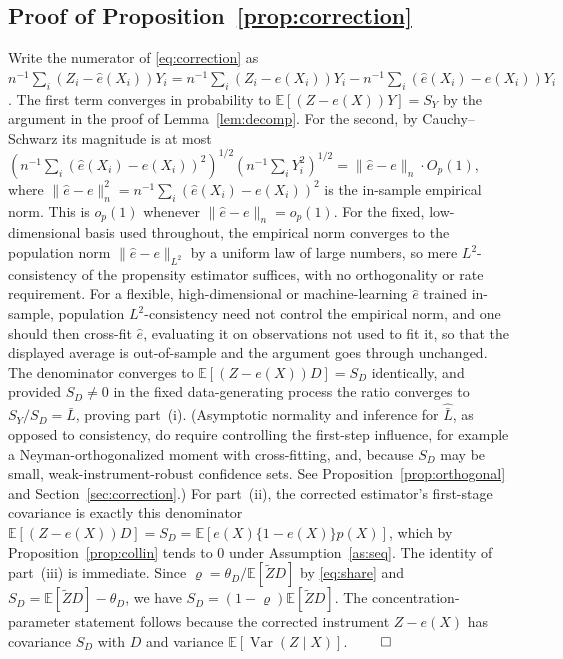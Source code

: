 \documentclass[preprint,11pt,authoryear]{elsarticle}
\theoremstyle{definition}
\newcommand{\E}{\mathbb{E}}
\newcommand{\Var}{\operatorname{Var}}
\newcommand{\Ztil}{\tilde{Z}}
\begin{document}
\subsection*{Proof of Proposition~\ref{prop:correction}}
Write the numerator of \eqref{eq:correction} as
$n^{-1}\sum_i(Z_i-\hat e(X_i))Y_i=n^{-1}\sum_i(Z_i-e(X_i))Y_i
-n^{-1}\sum_i(\hat e(X_i)-e(X_i))Y_i$. The first term converges in probability to
$\E[(Z-e(X))Y]=S_Y$ by the argument in the proof of Lemma~\ref{lem:decomp}. For
the second, by Cauchy--Schwarz its magnitude is at most
$(n^{-1}\sum_i(\hat e(X_i)-e(X_i))^2)^{1/2}(n^{-1}\sum_i Y_i^2)^{1/2}
=\|\hat e-e\|_{n}\cdot O_p(1)$, where $\|\hat e-e\|_{n}^2=n^{-1}\sum_i(\hat
e(X_i)-e(X_i))^2$ is the in-sample empirical norm. This is $o_p(1)$ whenever
$\|\hat e-e\|_{n}=o_p(1)$. For the fixed, low-dimensional basis used throughout,
the empirical norm converges to the population norm $\|\hat e-e\|_{L^2}$ by a
uniform law of large numbers, so mere $L^2$-consistency of the propensity estimator
suffices, with no orthogonality or rate requirement. For a flexible,
high-dimensional or machine-learning $\hat e$ trained in-sample, population
$L^2$-consistency need not control the empirical norm, and one should then cross-fit
$\hat e$, evaluating it on observations not used to fit it, so that the displayed
average is out-of-sample and the argument goes through unchanged. The
denominator converges
to $\E[(Z-e(X))D]=S_D$ identically, and provided $S_D\neq0$ in the fixed
data-generating process the ratio converges to $S_Y/S_D=\bar L$, proving
part~(i). (Asymptotic normality and inference for
$\hat{\bar L}$, as opposed to consistency, do require controlling the first-step
influence, for example a Neyman-orthogonalized moment with cross-fitting, and,
because $S_D$ may be small, weak-instrument-robust confidence sets. See
Proposition~\ref{prop:orthogonal} and Section~\ref{sec:correction}.) For
part~(ii), the corrected estimator's first-stage covariance
is exactly this denominator $\E[(Z-e(X))D]=S_D=\E[e(X)\{1-e(X)\}p(X)]$, which by
Proposition~\ref{prop:collin} tends to $0$ under Assumption~\ref{as:seq}. The
identity of part~(iii) is immediate. Since $\varrho=\theta_D/\E[\Ztil D]$
by \eqref{eq:share} and $S_D=\E[\Ztil D]-\theta_D$, we have $S_D=(1-\varrho)\E[\Ztil D]$.
The concentration-parameter statement follows because the corrected instrument
$Z-e(X)$ has covariance $S_D$ with $D$ and variance $\E[\Var(Z\mid X)]$. \hfill$\qed$
\end{document}
